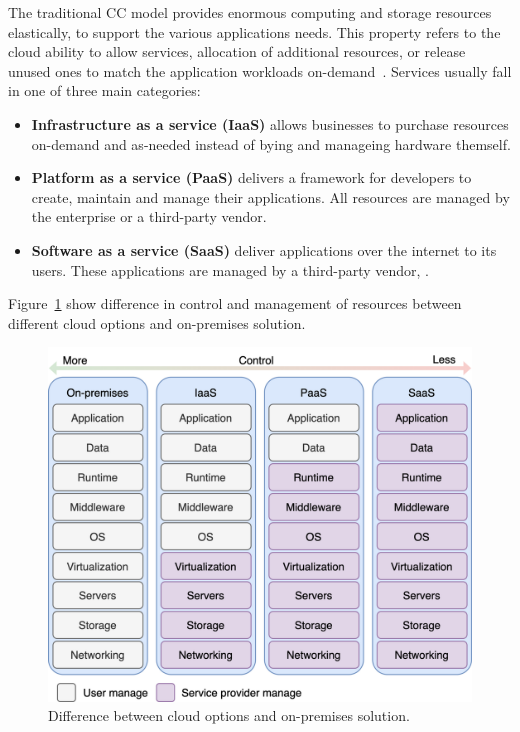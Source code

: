The traditional CC model provides enormous computing and storage resources elastically, to support the various applications needs. This property refers to the cloud ability to allow services, allocation of additional resources, or release unused ones to match the application workloads on-demand~\cite{AssuncaoVB18}. Services usually fall in one of three main categories: 

\begin{itemize}
	\item \textbf{Infrastructure as a service (IaaS)} allows businesses to purchase resources on-demand and as-needed instead of bying and manageing hardware themself.
	\item \textbf{Platform as a service (PaaS)} delivers a framework for developers to create, maintain and manage their applications. All resources are managed by the enterprise or a third-party vendor.
	\item \textbf{Software as a service (SaaS)} deliver applications over the internet to its users. These applications are managed by a third-party vendor, .
\end{itemize}

Figure~\ref{fig:fig1} show difference in control and management of resources between different cloud options and on-premises solution.

\begin{figure}[H]
	\begin{center}
		\includegraphics[scale=0.9]{images/Figure1.png}
	\end{center}
	\vspace{-0.6cm}
	\caption{Difference between cloud options and on-premises solution.}
	\label{fig:fig1}
\end{figure}

